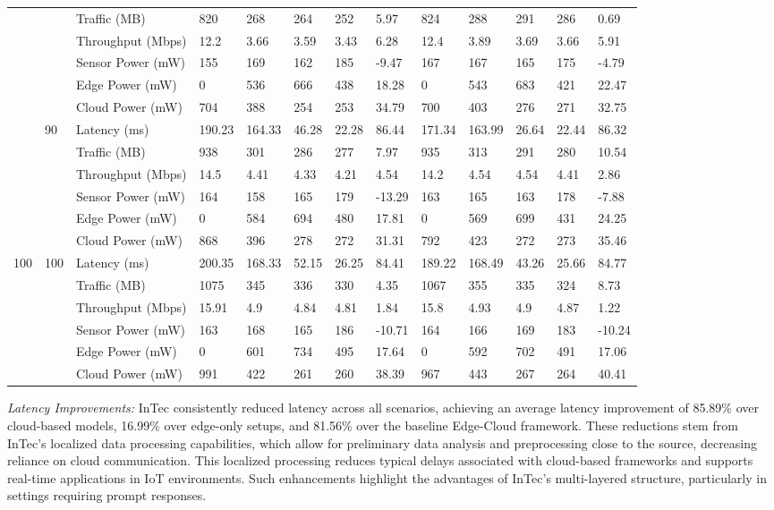 \documentclass[11pt]{article}
\begin{document}
\begin{landscape}
\begin{longtable}{@{}lllllllllllll@{}}
			& & Traffic (MB) & 820 & 268 & 264 & 252 & 5.97 & 824 & 288 & 291 & 286 & 0.69 \\
			& & Throughput (Mbps) & 12.2 & 3.66 & 3.59 & 3.43 & 6.28 & 12.4 & 3.89 & 3.69 & 3.66 & 5.91 \\
			& & Sensor Power (mW) & 155 & 169 & 162 & 185 & -9.47 & 167 & 167 & 165 & 175 & -4.79 \\
			& & Edge Power (mW) & 0 & 536 & 666 & 438 & 18.28 & 0 & 543 & 683 & 421 & 22.47 \\
			& & Cloud Power (mW) & 704 & 388 & 254 & 253 & 34.79 & 700 & 403 & 276 & 271 & 32.75 \\
			\midrule
			\pagebreak	
			\multirow{6}{*}{90} & \multirow{6}{*}{90} & Latency (ms) & 190.23 & 164.33 & 46.28 & 22.28 & 86.44 & 171.34 & 163.99 & 26.64 & 22.44 & 86.32 \\
			& & Traffic (MB) & 938 & 301 & 286 & 277 & 7.97 & 935 & 313 & 291 & 280 & 10.54 \\
			& & Throughput (Mbps) & 14.5 & 4.41 & 4.33 & 4.21 & 4.54 & 14.2 & 4.54 & 4.54 & 4.41 & 2.86 \\
			& & Sensor Power (mW) & 164 & 158 & 165 & 179 & -13.29 & 163 & 165 & 163 & 178 & -7.88 \\
			& & Edge Power (mW) & 0 & 584 & 694 & 480 & 17.81 & 0 & 569 & 699 & 431 & 24.25 \\
			& & Cloud Power (mW) & 868 & 396 & 278 & 272 & 31.31 & 792 & 423 & 272 & 273 & 35.46 \\
			\midrule
			\multirow{6}{*}{100} & \multirow{6}{*}{100} & Latency (ms) & 200.35 & 168.33 & 52.15 & 26.25 & 84.41 & 189.22 & 168.49 & 43.26 & 25.66 & 84.77 \\
			& & Traffic (MB) & 1075 & 345 & 336 & 330 & 4.35 & 1067 & 355 & 335 & 324 & 8.73 \\
			& & Throughput (Mbps)  & 15.91 & 4.9 & 4.84 & 4.81 & 1.84 & 15.8 & 4.93 & 4.9 & 4.87 & 1.22 \\
			& & Sensor Power (mW) & 163 & 168 & 165 & 186 & -10.71 & 164 & 166 & 169 & 183 & -10.24 \\
			& & Edge Power (mW) & 0 & 601 & 734 & 495 & 17.64 & 0 & 592 & 702 & 491 & 17.06 \\
			& & Cloud Power (mW) & 991 & 422 & 261 & 260 & 38.39 & 967 & 443 & 267 & 264 & 40.41 \\
			\bottomrule
		\end{longtable}
	\end{landscape}
	
	
		\textit{Latency Improvements:} InTec consistently reduced latency across all scenarios,
	achieving an average latency improvement of 85.89\% over cloud-based models,
	16.99\% over edge-only setups, and 81.56\% over the baseline Edge-Cloud framework. These reductions stem from InTec’s localized data processing capabilities,
	which allow for preliminary data analysis and preprocessing close to the source,
	decreasing reliance on cloud communication. This localized processing reduces typical delays associated with cloud-based frameworks and supports real-time applications in IoT environments. Such enhancements highlight the advantages of InTec’s
	multi-layered structure, particularly in settings requiring prompt responses.
	
\end{document}
